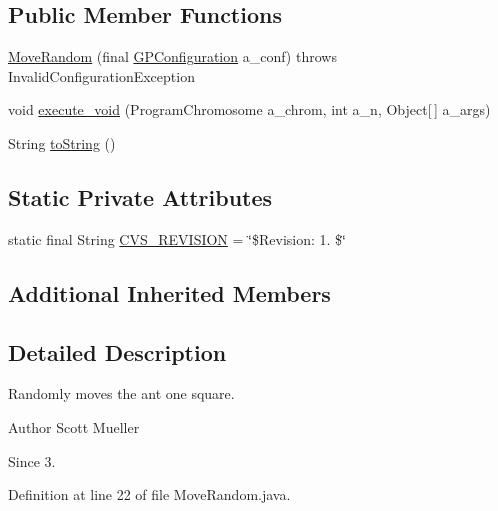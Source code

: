 \subsection*{Public Member Functions}
\begin{DoxyCompactItemize}
\item 
\hyperlink{classexamples_1_1gp_1_1painted_desert_1_1_move_random_a4b17177c971af9499bfe477ce5a01988}{Move\-Random} (final \hyperlink{classorg_1_1jgap_1_1gp_1_1impl_1_1_g_p_configuration}{G\-P\-Configuration} a\-\_\-conf)  throws Invalid\-Configuration\-Exception 
\item 
void \hyperlink{classexamples_1_1gp_1_1painted_desert_1_1_move_random_a21f13bb56a50e7d89c86db0999fe9ac1}{execute\-\_\-void} (Program\-Chromosome a\-\_\-chrom, int a\-\_\-n, Object\mbox{[}$\,$\mbox{]} a\-\_\-args)
\item 
String \hyperlink{classexamples_1_1gp_1_1painted_desert_1_1_move_random_a0531a7c89fca06a7564f5a4187c498bc}{to\-String} ()
\end{DoxyCompactItemize}
\subsection*{Static Private Attributes}
\begin{DoxyCompactItemize}
\item 
static final String \hyperlink{classexamples_1_1gp_1_1painted_desert_1_1_move_random_ae912563513e7687d46ce283d2a51148a}{C\-V\-S\-\_\-\-R\-E\-V\-I\-S\-I\-O\-N} = \char`\"{}\$Revision\-: 1. \$\char`\"{}
\end{DoxyCompactItemize}
\subsection*{Additional Inherited Members}


\subsection{Detailed Description}
Randomly moves the ant one square.

\begin{DoxyAuthor}{Author}
Scott Mueller 
\end{DoxyAuthor}
\begin{DoxySince}{Since}
3. 
\end{DoxySince}


Definition at line 22 of file Move\-Random.\-java.



